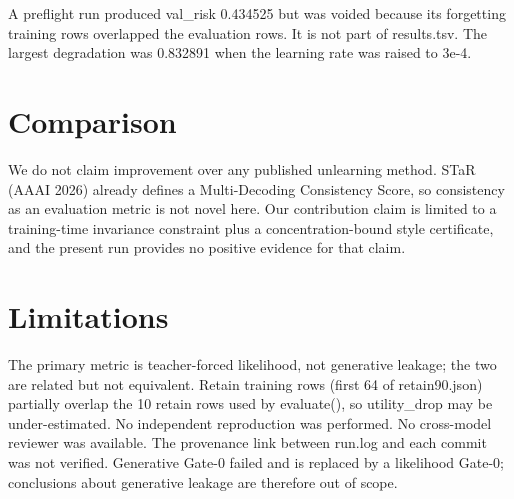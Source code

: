 \documentclass{article}
\begin{document}
A preflight run produced val\_risk 0.434525 but was voided because its forgetting
training rows overlapped the evaluation rows. It is not part of results.tsv.
The largest degradation was 0.832891 when the learning rate was raised to 3e-4.

\section{Comparison}
We do not claim improvement over any published unlearning method. STaR (AAAI 2026)
already defines a Multi-Decoding Consistency Score, so consistency as an evaluation
metric is not novel here. Our contribution claim is limited to a training-time
invariance constraint plus a concentration-bound style certificate, and the present
run provides no positive evidence for that claim.

\section{Limitations}
The primary metric is teacher-forced likelihood, not generative leakage; the two
are related but not equivalent. Retain training rows (first 64 of retain90.json)
partially overlap the 10 retain rows used by evaluate(), so utility\_drop may be
under-estimated. No independent reproduction was performed. No cross-model
reviewer was available. The provenance link between run.log and each commit was
not verified. Generative Gate-0 failed and is replaced by a likelihood Gate-0;
conclusions about generative leakage are therefore out of scope.
\end{document}
